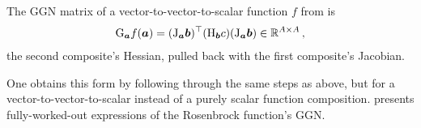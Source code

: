 \begin{definition}\label{def:vector_ggn}
  The GGN matrix of a vector-to-vector-to-scalar function $f$ from  is
  \begin{align*}
    \mathrm{G}_{{\bm{a}}} f({\bm{a}})
    =
    (\mathrm{J}_{{\bm{a}}} {\bm{b}})^{\top}
    (\mathrm{H}_{{\bm{b}}} c)
    (\mathrm{J}_{{\bm{a}}} {\bm{b}}) \in {\mathbb{R}}^{A \times A}\,,
  \end{align*}
  \ie the second composite's Hessian, pulled back with the first composite's Jacobian.
\end{definition}

One obtains this form by following through the same steps as above, but for a vector-to-vector-to-scalar instead of a purely scalar function composition.  presents fully-worked-out expressions of the Rosenbrock function's GGN.

